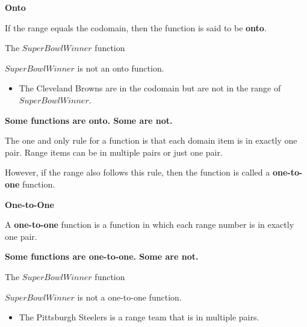 \documentclass{ximera}
\begin{document}
\begin{definition} \textbf{\textcolor{green!50!black}{Onto}} 

If the range equals the codomain, then the function is said to be \textbf{onto}.

\end{definition}









\begin{example} The $SuperBowlWinner$ function


$SuperBowlWinner$ is not an onto function.


\begin{itemize}
\item The Cleveland Browns are in the codomain but are not in the range of $SuperBowlWinner$.  
\end{itemize}

\end{example}







\textbf{\textcolor{blue!55!black}{Some functions are onto. Some are not.}}  




The one and only rule for a function is that each domain item is in exactly one pair.  Range items can be in multiple pairs or just one pair. 

However, if the range also follows this rule, then the function is called a \textbf{one-to-one} function.



\begin{definition} \textbf{\textcolor{green!50!black}{One-to-One}} 

A \textbf{one-to-one} function is a function in which each range number is in exactly one pair.

\end{definition}




\textbf{\textcolor{blue!55!black}{Some functions are one-to-one. Some are not.}}  














\begin{example} The $SuperBowlWinner$ function


$SuperBowlWinner$ is not a one-to-one function.


\begin{itemize}
\item The Pittsburgh Steelers is a range team that is in multiple pairs. 
\end{itemize}

\end{example}
\end{document}

